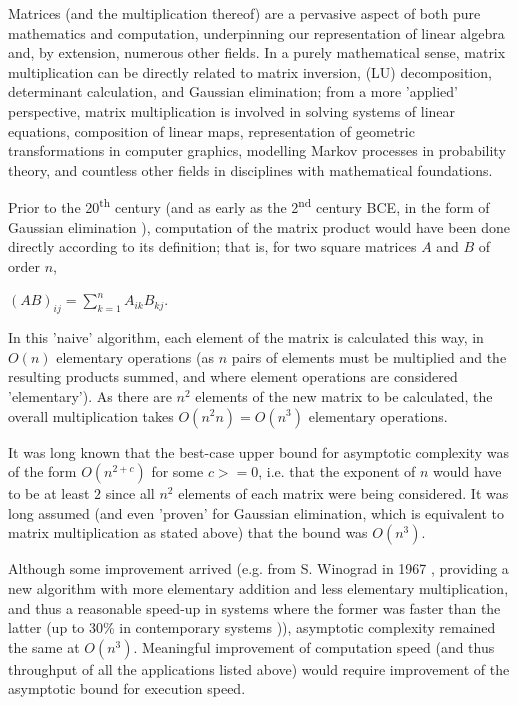 \documentclass[11pt]{article}
\begin{document}
Matrices (and the multiplication thereof) are a pervasive aspect of both 
pure mathematics and computation, underpinning our representation of linear 
algebra and, by extension, numerous other fields. In a purely mathematical 
sense, matrix multiplication can be directly related to matrix inversion, (LU) 
decomposition, determinant calculation, and Gaussian elimination;
from a more 'applied' perspective, matrix multiplication is involved in solving 
systems of linear equations, composition of linear maps, representation of 
geometric transformations in computer graphics, modelling Markov processes in 
probability theory, and countless other fields in disciplines with mathematical 
foundations. \par
Prior to the 20\textsuperscript{th} century (and as early as the 
2\textsuperscript{nd} century BCE, in the form of Gaussian elimination 
\cite{calinger1999contextual}), computation of the matrix product would have 
been done directly according to its definition; that is, for two square 
matrices $A$ and $B$ of order $n$, \par
\centerline{$(AB)_{ij} = \sum_{k=1}^{n} A_{ik}B_{kj}$.} \par
In this 'naive' algorithm, each element of the matrix is calculated this way, 
in $O(n)$ elementary operations (as $n$ pairs of elements must be multiplied 
and the resulting products summed, and where element operations are considered 
'elementary'). As there are $n^2$ elements of the new matrix to be calculated, 
the overall multiplication takes $O(n^2n) = O(n^3)$ elementary operations. \par
It was long known that the best-case upper bound for asymptotic complexity 
was of the form $O(n^{2+c})$ for some $c >= 0$, i.e. that the 
exponent of $n$ would have to be at least $2$ since all $n^2$ elements of each 
matrix were being considered. It was long assumed (and even 'proven' 
\cite{klyuev1965minimization} for Gaussian elimination, which is equivalent to 
matrix multiplication as stated above) that the bound was $O(n^3)$. \par
Although some improvement arrived (e.g. from S. Winograd in 1967 
\cite{winograd1968new}, providing a new algorithm with more elementary addition 
and less elementary multiplication, and thus a reasonable speed-up in systems 
where the former was faster than the latter (up to 30\% in contemporary systems 
\cite{brent1970algorithms})), asymptotic complexity remained the same at 
$O(n^3)$. Meaningful improvement of computation speed (and thus throughput 
of all the applications listed above) would require improvement of the 
asymptotic bound for execution speed.
\end{document}
